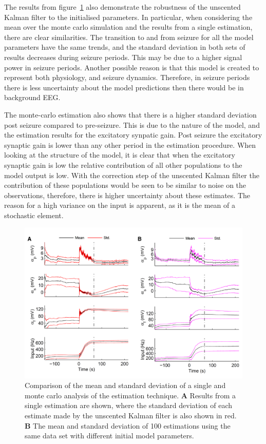 The results from figure~\ref{fig: MonteResults} also demonstrate the robustness of the unscented Kalman filter to the initialised parameters. In particular, when considering the mean over the monte carlo simulation and the results from a single estimation, there are clear similarities. The transition to and from seizure for all the model parameters have the same trends, and the standard deviation in both sets of results decreases during seizure periods. This may be due to a higher signal power in seizure periods. Another possible reason is that this model is created to represent both physiology, and seizure dynamics. Therefore, in seizure periods there is less uncertainty about the model predictions then there would be in background EEG.

The monte-carlo estimation also shows that there is a higher standard deviation post seizure compared to pre-seizure. This is due to the nature of the model, and the estimation results for the excitatory synpatic gain. Post seizure the excitatory synaptic gain is lower than any other period in the estimation procedure. When looking at the structure of the model, it is clear that when the excitatory synaptic gain is low the relative contribution of all other populations to the model output is low. With the correction step of the unscented Kalman filter the contribution of these populations would be seen to be similar to noise on the observations, therefore, there is higher uncertainty about these estimates. The reason for a high variance on the input is apparent, as it is the mean of a stochastic element. 

\begin{figure}[ht]
	\centering
		\includegraphics{fig/MonteResults.pdf}
	\caption{Comparison of the mean and standard deviation of a single and monte carlo analysis of the estimation technique. \textbf{A} Results from a single estimation are shown, where the standard deviation of each estimate made by the unscented Kalman filter is also shown in red. \textbf{B} The mean and standard deviation of 100 estimations using the same data set with different initial model parameters.}
	\label{fig: MonteResults}
\end{figure}
 